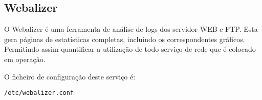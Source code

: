 \subsection{Webalizer}

O Webalizer é uma ferramenta de análise de logs dos servidor WEB e FTP. Esta gera páginas de estatísticas completas, incluindo os correspondentes gráficos. Permitindo assim quantificar a utilização de todo serviço de rede que é colocado em operação.

O ficheiro de configuração deste serviço é:

\begin{Verbatim}[commandchars=\\\{\}]
/etc/webalizer.conf
\end{Verbatim}
